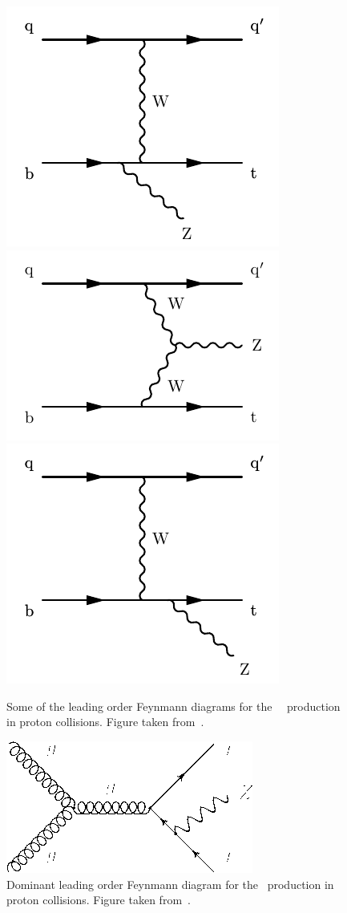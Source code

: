 \begin{figure}[htbp]
	\centering
	\includegraphics[width=0.3\linewidth]{6_Search/Figures/Feynman/tZq}
	\includegraphics[width=0.3\linewidth]{6_Search/Figures/Feynman/tZq2}
	\includegraphics[width=0.3\linewidth]{6_Search/Figures/Feynman/tZq3}
		\caption{Some of the leading order Feynmann diagrams for the \SM\ \tZq\ production in proton collisions. Figure taken from~\cite{CMS-PAS-TOP-16-020}.}
	\label{fig:tZq}
\end{figure}

\begin{figure}[htbp]
	\centering
	\includegraphics[width=0.3\linewidth]{6_Search/Figures/Feynman/ttZ}
	\caption{Dominant leading order Feynmann diagram for the \ttZ\ production in proton collisions. Figure taken from~\cite{Khachatryan:1712680}.}
	\label{fig:ttZ}
\end{figure}

